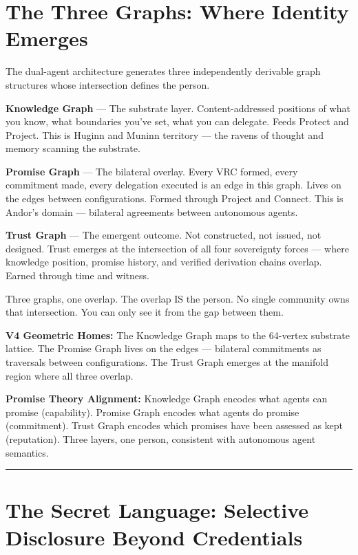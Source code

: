 \documentclass[
]{article}
\begin{document}
\section{The Three Graphs: Where Identity
Emerges}\label{the-three-graphs-where-identity-emerges}

The dual-agent architecture generates three independently derivable
graph structures whose intersection defines the person.

\textbf{Knowledge Graph} --- The substrate layer. Content-addressed
positions of what you know, what boundaries you've set, what you can
delegate. Feeds Protect and Project. This is Huginn and Muninn territory
--- the ravens of thought and memory scanning the substrate.

\textbf{Promise Graph} --- The bilateral overlay. Every VRC formed,
every commitment made, every delegation executed is an edge in this
graph. Lives on the edges between configurations. Formed through Project
and Connect. This is Andor's domain --- bilateral agreements between
autonomous agents.

\textbf{Trust Graph} --- The emergent outcome. Not constructed, not
issued, not designed. Trust emerges at the intersection of all four
sovereignty forces --- where knowledge position, promise history, and
verified derivation chains overlap. Earned through time and witness.

Three graphs, one overlap. The overlap IS the person. No single
community owns that intersection. You can only see it from the gap
between them.

\textbf{V4 Geometric Homes:} The Knowledge Graph maps to the 64-vertex
substrate lattice. The Promise Graph lives on the edges --- bilateral
commitments as traversals between configurations. The Trust Graph
emerges at the manifold region where all three overlap.

\textbf{Promise Theory Alignment:} Knowledge Graph encodes what agents
can promise (capability). Promise Graph encodes what agents do promise
(commitment). Trust Graph encodes which promises have been assessed as
kept (reputation). Three layers, one person, consistent with autonomous
agent semantics.

\begin{center}\rule{0.5\linewidth}{0.5pt}\end{center}

\section{The Secret Language: Selective Disclosure Beyond
Credentials}\label{the-secret-language-selective-disclosure-beyond-credentials}
\end{document}
